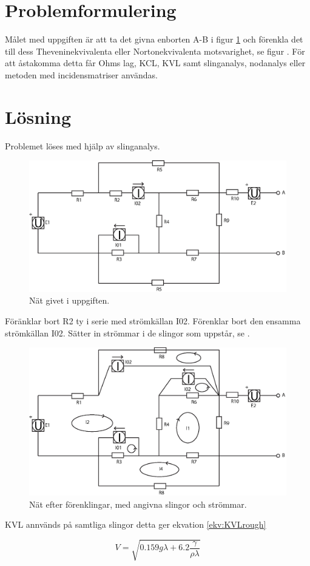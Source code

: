 \documentclass[a4paper,12pt]{article}
\begin{document}
\maketitle
\thispagestyle{empty}
\newpage

\section*{Problemformulering}
Målet med uppgiften är att ta det givna enborten A-B i figur \ref{fig:original} och förenkla det till dess Theveninekvivalenta eller Nortonekvivalenta motsvarighet, se figur \fig{}. För att åstakomma detta får Ohms lag, KCL, KVL samt slinganalys, nodanalys eller metoden med incidensmatriser användas.

\section*{Lösning}
Problemet löses med hjälp av slinganalys.

\begin{figure}[h]
\centering
\includegraphics[width=1\textwidth]{bilder/originalnat.eps}
\caption{Nät givet i uppgiften.}
\label{fig:original}
\end{figure}

Föränklar bort R2 ty i serie med strömkällan I02. Förenklar bort den ensamma strömkällan I02. Sätter in strömmar i de slingor som uppstår, se .

\begin{figure}[h]
\centering
\includegraphics[width=1\textwidth]{bilder/modnat.eps}
\caption{Nät efter förenklingar, med angivna slingor och strömmar.}
\label{fig:modnat}
\end{figure}

KVL annvänds på samtliga slingor detta ger ekvation \ref{ekv:KVLrough}

\begin{equation}
V=\sqrt{0.159g\lambda+6.2\frac{\gamma}{\rho\lambda}}
\label{ekv:KVLrough}
\end{equation}
\end{document}
